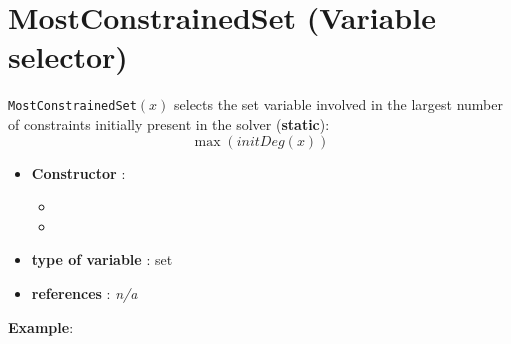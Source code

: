 \section{MostConstrainedSet (Variable selector)}\label{mostconstrainedset:mostconstrainedsetvarselector}\hypertarget{mostconstrainedset:mostconstrainedsetvarselector}{}
\begin{notedef}
  \texttt{MostConstrainedSet}$(x)$ selects the set variable involved in the largest number of constraints initially present in the solver (\textbf{static}):
$$\max(initDeg(x))$$
\end{notedef}

\begin{itemize}
	\item \textbf{Constructor} : 
	\begin{itemize}
	\item {}
	\item {}
	\end{itemize}	
	\item \textbf{type of variable} : set
	\item \textbf{references} : \emph{n/a}
\end{itemize}

\textbf{Example}:
%

